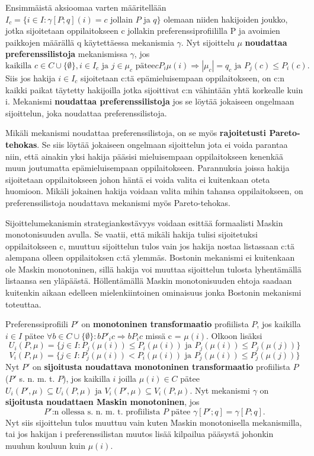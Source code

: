 \documentclass{tktltiki}
\begin{document}
Ensimmäistä aksioomaa varten määritellään \\ \(I_c = \{i \in I :
\gamma [P;q](i) = c\) jollain \(P\) ja \(q\}\) olemaan niiden
hakijoiden joukko, jotka sijoitetaan oppilaitokseen c jollakin
preferenssiprofiililla P ja avoimien paikkojen määrällä q käytettäessa
mekanismia \(\gamma\). Nyt sijoittelu \(\mu\) \textbf{noudattaa
  preferenssilistoja} mekanismissa \(\gamma\), jos \[\text{kaikilla }c
\in C \cup \{\emptyset\}, i \in I_c\text{ ja } j \in \mu_c\text{ pätee
}cP_{i}\mu(i) \Rightarrow |\mu_c| = q_c\text{ ja }P_j(c) \leq
P_i(c).\] Siis jos hakija \(i \in I_c\) sijoitetaan c:tä
epämieluisempaan oppilaitokseen, on c:n kaikki paikat täytetty
hakijoilla jotka sijoittivat c:n vähintään yhtä korkealle kuin i.
Mekanismi \textbf{noudattaa preferenssilistoja} jos se löytää
jokaiseen ongelmaan sijoittelun, joka noudattaa preferenssilistoja.

Mikäli mekanismi noudattaa preferenssilistoja, on se myös
\textbf{rajoitetusti Pareto-tehokas}. Se siis löytää jokaiseen ongelmaan
sijoittelun jota ei voida parantaa niin, että ainakin yksi hakija
pääsisi mieluisempaan oppilaitokseen kenenkää muun joutumatta
epämieluisempaan oppilaitokseen. Parannuksia joissa hakija sijoitetaan
oppilaitokseen johon häntä ei voida valita ei kuitenkaan oteta
huomioon. Mikäli jokainen hakija voidaan valita mihin tahansa
oppilaitokseen, on preferenssilistoja noudattava mekanismi myös
Pareto-tehokas.

Sijoittelumekanismin strategiankestävyys voidaan esittää formaalisti
Maskin monotonisuuden avulla. Se vaatii, että mikäli hakija tulisi
sijoitetuksi oppilaitokseen c, muuttuu sijoittelun tulos vain jos
hakija nostaa listassaan c:tä alempana olleen oppilaitoksen c:tä
ylemmäs. Bostonin mekanismi ei kuitenkaan ole Maskin monotoninen,
sillä hakija voi muuttaa sijoittelun tulosta lyhentämällä listaansa
sen yläpäästä. Höllentämällä Maskin monotonisuuden ehtoja saadaan
kuitenkin aikaan edelleen mielenkiintoinen ominaisuus jonka Bostonin
mekanismi toteuttaa.

Preferenssiprofiili \(P'\) on \textbf{monotoninen transformaatio}
profiilista \(P\), jos kaikilla \(i \in I\) pätee \(\forall b \in C
\cup \{\emptyset\}:bP'_{i}c \Rightarrow bP_{i}c\) missä c =
\(\mu(i)\). Olkoon lisäksi \[U_i(P,\mu) = \{j \in I : P_j(\mu (i)) \leq
P_i(\mu (i)) \text{ ja } P_j(\mu (i)) \leq P_j(\mu (j))\}\]
\[V_i(P,\mu) = \{j \in I : P_j(\mu (i)) < P_i(\mu (i)) \text{ ja } P_j(\mu
(i)) \leq P_j(\mu (j))\}\] Nyt \(P'\) on \textbf{sijoitusta noudattava
  monotoninen transformaatio} profiilista \(P\) (\(P'\) s. n. m. t.
\(P\)), jos kaikilla \(i\) joilla \(\mu (i) \in C\) pätee
\(U_i(P',\mu) \subseteq U_i(P,\mu) \text{ ja } V_i(P',\mu) \subseteq
V_i(P,\mu)\). Nyt mekanismi \(\gamma\) on \textbf{sijoitusta
  noudattaen Maskin monotoninen}, jos \[P'\text{:n ollessa s. n. m. t.
  profiilista }P \text{ pätee }\gamma [P';q] = \gamma [P;q].\] Nyt
siis sijoittelun tulos muuttuu vain kuten Maskin monotonisella
mekanismilla, tai jos hakijan i preferenssilistan muutos lisää
kilpailua pääsystä johonkin muuhun kouluun kuin \(\mu (i)\).
\end{document}
